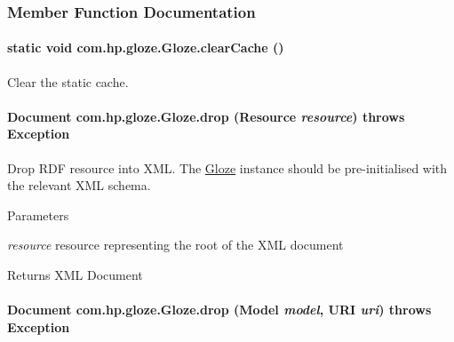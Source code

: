 \subsubsection{Member Function Documentation}
\hypertarget{classcom_1_1hp_1_1gloze_1_1_gloze_ac68dbbdb47a624bd15475e0e05f428d8}{
\paragraph[{clearCache}]{\setlength{\rightskip}{0pt plus 5cm}static void com.hp.gloze.Gloze.clearCache ()}\hfill}
\label{classcom_1_1hp_1_1gloze_1_1_gloze_ac68dbbdb47a624bd15475e0e05f428d8}
Clear the static cache. \hypertarget{classcom_1_1hp_1_1gloze_1_1_gloze_a922d878145fee8de5841693ebd3cbf42}{
\paragraph[{drop}]{\setlength{\rightskip}{0pt plus 5cm}Document com.hp.gloze.Gloze.drop (Resource {\em resource})  throws Exception }\hfill}
\label{classcom_1_1hp_1_1gloze_1_1_gloze_a922d878145fee8de5841693ebd3cbf42}
Drop RDF resource into XML. The \hyperlink{classcom_1_1hp_1_1gloze_1_1_gloze}{Gloze} instance should be pre-\/initialised with the relevant XML schema. 
\begin{DoxyParams}{Parameters}
\item[{\em resource}]resource representing the root of the XML document \end{DoxyParams}
\begin{DoxyReturn}{Returns}
XML Document 
\end{DoxyReturn}
\hypertarget{classcom_1_1hp_1_1gloze_1_1_gloze_afadb6872a06d0ae277b0605ea7a45084}{
\paragraph[{drop}]{\setlength{\rightskip}{0pt plus 5cm}Document com.hp.gloze.Gloze.drop (Model {\em model}, \/  URI {\em uri})  throws Exception }\hfill}
\label{classcom_1_1hp_1_1gloze_1_1_gloze_afadb6872a06d0ae277b0605ea7a45084}
